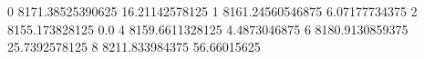 0 8171.38525390625 16.21142578125
1 8161.24560546875 6.07177734375
2 8155.173828125 0.0
4 8159.6611328125 4.4873046875
6 8180.9130859375 25.7392578125
8 8211.833984375 56.66015625
